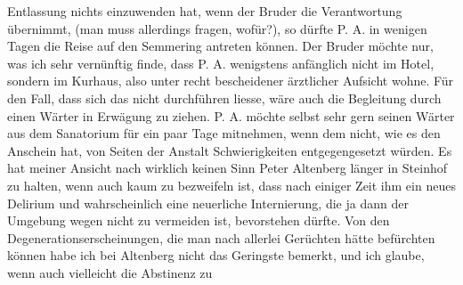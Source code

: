 {\begin{ledgroupsized}[t]{13cm}
               Entlassung nichts einzuwenden hat, wenn der Bruder die Verantwortung übernimmt, (man muss allerdings
               fragen, wofür?), so dürfte P. A. in wenigen Tagen
               die Reise auf den Semmering antreten können. Der Bruder möchte nur, was ich sehr
               vernünftig finde, dass P. A. wenigstens anfänglich
               nicht im Hotel, sondern im Kurhaus, also unter recht
               bescheidener ärztlicher Aufsicht wohne. Für den Fall, dass sich das nicht durchführen
               liesse, wäre auch die Begleitung durch einen Wärter in Erwägung zu ziehen. P. A. möchte selbst sehr gern seinen Wärter aus dem Sanatorium für
               ein paar Tage mitnehmen, wenn dem nicht, wie es den Anschein hat, von Seiten der
               Anstalt Schwierigkei{\pb}ten entgegengesetzt würden. Es hat meiner Ansicht nach wirklich keinen Sinn Peter Altenberg länger in Steinhof zu halten, wenn auch kaum zu bezweifeln ist, dass nach
               einiger Zeit ihm ein neues Delirium und wahrscheinlich eine neuerliche Internierung,
               die ja dann der Umgebung wegen nicht zu vermeiden ist, bevorstehen dürfte. Von den
               Degenerationserscheinungen, die man nach allerlei Gerüchten hätte befürchten können
               habe ich bei Altenberg nicht das Geringste
               bemerkt, und ich glaube, wenn auch vielleicht die \label{T_L02129_1v}\label{T_L02129_1h} Abstinenz zu

\end{ledgroupsized}}
